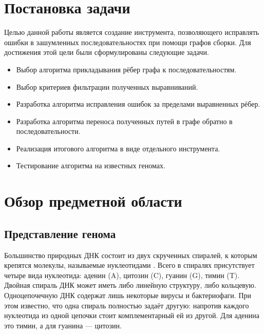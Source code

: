 \documentclass[14pt]{matmex-diploma-custom}
\begin{document}
%
%
%
%





\section{Постановка задачи}
Целью данной работы является создание инструмента, позволяющего исправлять ошибки в зашумленных последовательностях при помощи графов сборки. Для достижения этой цели были сформулированы следующие задачи.
\begin{itemize}
    \item Выбор алгоритма прикладывания рёбер графа к последовательностям.
    \item Выбор критериев фильтрации полученных выравниваний.
    \item Разработка алгоритма исправления ошибок за пределами выравненных рёбер.
    \item Разработка алгоритма переноса полученных путей в графе обратно в последовательности.
    \item Реализация итогового алгоритма в виде отдельного инструмента.
    \item Тестирование алгоритма на известных геномах.
\end{itemize}

\section{Обзор предметной области}
\subsection{Представление генома}
Большинство природных ДНК состоит из двух скрученных спиралей, к которым крепятся молекулы, называемые нуклеотидами \cite{art:Watson}. Всего в спиралях присутствует четыре вида нуклеотида: аденин (A), цитозин (C), гуанин (G), тимин (T). Двойная спираль ДНК может иметь либо линейную структуру, либо кольцевую. Одноцепочечную ДНК содержат лишь некоторые вирусы и бактериофаги. При этом известно, что одна спираль полностью задаёт другую: напротив каждого нуклеотида из одной цепочки стоит комплементарный ей из другой. Для аденина это тимин, а для гуанина --- цитозин.
\end{document}
